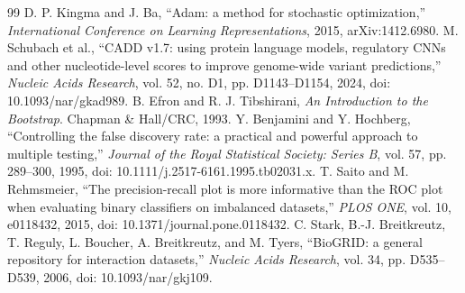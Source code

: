 \documentclass[conference]{IEEEtran}
\begin{document}
\begin{thebibliography}{99}
 D. P. Kingma and J. Ba, ``Adam: a method for stochastic optimization,'' \emph{International Conference on Learning Representations}, 2015, arXiv:1412.6980.
 M. Schubach et al., ``CADD v1.7: using protein language models, regulatory CNNs and other nucleotide-level scores to improve genome-wide variant predictions,'' \emph{Nucleic Acids Research}, vol. 52, no. D1, pp. D1143--D1154, 2024, doi: 10.1093/nar/gkad989.
 B. Efron and R. J. Tibshirani, \emph{An Introduction to the Bootstrap}. Chapman \& Hall/CRC, 1993.
 Y. Benjamini and Y. Hochberg, ``Controlling the false discovery rate: a practical and powerful approach to multiple testing,'' \emph{Journal of the Royal Statistical Society: Series B}, vol. 57, pp. 289--300, 1995, doi: 10.1111/j.2517-6161.1995.tb02031.x.
 T. Saito and M. Rehmsmeier, ``The precision-recall plot is more informative than the ROC plot when evaluating binary classifiers on imbalanced datasets,'' \emph{PLOS ONE}, vol. 10, e0118432, 2015, doi: 10.1371/journal.pone.0118432.
 C. Stark, B.-J. Breitkreutz, T. Reguly, L. Boucher, A. Breitkreutz, and M. Tyers, ``BioGRID: a general repository for interaction datasets,'' \emph{Nucleic Acids Research}, vol. 34, pp. D535--D539, 2006, doi: 10.1093/nar/gkj109.
\end{thebibliography}
\end{document}
